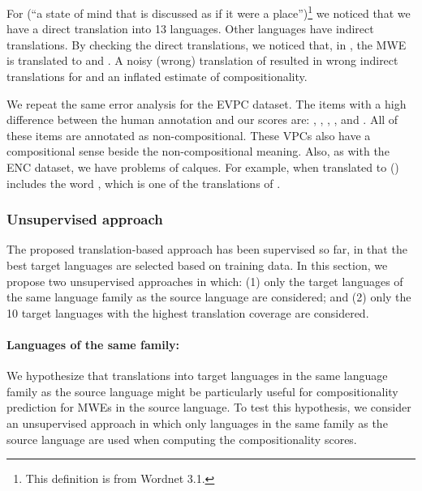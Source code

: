 \documentclass[output=paper,modfonts,nonflat]{langsci/langscibook}
\begin{document}
For  (``a state of mind that is discussed as if it
were a place'')\footnote{This definition is from Wordnet 3.1.} we
noticed that we have a direct translation into 13 languages. Other
languages have indirect translations. By checking the direct
translations, we noticed that, in , the MWE is translated to
 and . A noisy (wrong) translation of
  resulted in wrong indirect translations for
 and an inflated estimate of compositionality.

We repeat the same error analysis for the EVPC dataset. The items with
a high difference between the human annotation and our scores are:
, , ,
,  and . All
of these items are annotated as non-compositional. These VPCs also
have a compositional sense beside the non-compositional meaning. Also,
as with the ENC dataset, we have problems of calques. For example, 
 when translated to  ()
includes the word , which is one of the translations of
.

\subsubsection{Unsupervised approach}
\label{sec:ch4-1:unsupervised}


The proposed translation-based  approach has been
supervised so far, in that the best target languages are selected
based on training data. In this section, we propose two unsupervised
approaches in which: (1) only the target languages of the same language
family as the source language are considered; and (2) only the 10
target languages with the highest translation coverage are considered.

\paragraph*{Languages of the same family:}


We hypothesize that translations into target languages in the same
language family as the source language might be particularly useful
for compositionality prediction for MWEs in the source language. To
test this hypothesis, we consider an unsupervised approach in which
only languages in the same family as the source language are used when
computing the compositionality scores.
\end{document}
